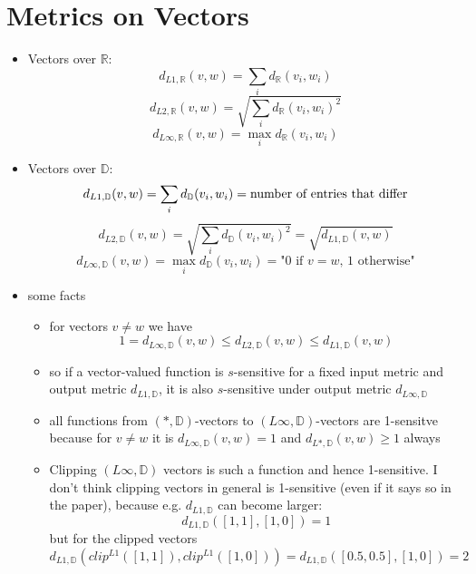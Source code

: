 \documentclass{article}
\begin{document}
\section*{Metrics on Vectors}
\begin{itemize}
   \item Vectors over $\mathbb{R}$:
      \[  d_{L1,\mathbb{R}}(v,w) = \sum_i d_\mathbb{R}(v_i, w_i) \]
      \[  d_{L2,\mathbb{R}}(v,w) = \sqrt{\sum_i d_\mathbb{R}(v_i, w_i)^2} \]
      \[  d_{L\infty,\mathbb{R}}(v,w) = \max_i d_\mathbb{R}(v_i, w_i) \]
   \item Vectors over $\mathbb{D}$:
      \[  d_{L1,\mathbb{D}}(v,w) = \sum_i d_\mathbb{D}(v_i, w_i) = \textnormal{number of entries that differ} \]
      \[  d_{L2,\mathbb{D}}(v,w) = \sqrt{\sum_i d_\mathbb{D}(v_i, w_i)^2} = \sqrt{d_{L1,\mathbb{D}}(v,w) } \]
      \[  d_{L\infty,\mathbb{D}}(v,w) = \max_i d_\mathbb{D}(v_i, w_i) = \text{"} 0 \text{ if } v=w \text{, 1 otherwise"} \]
   \item some facts
      \begin{itemize}
         \item for vectors $v\neq w$ we have
            $$1 = d_{{L\infty},\mathbb{D}}(v,w) \leq d_{L2,\mathbb{D}}(v,w) \leq d_{L1,\mathbb{D}}(v,w)$$
         \item so if a vector-valued function is $s$-sensitive for a fixed input metric and output metric $d_{L1,\mathbb{D}}$, it is also $s$-sensitive under output metric $d_{L\infty,\mathbb{D}}$
         \item all functions from $(*,\mathbb{D})$-vectors to $(L\infty,\mathbb{D})$-vectors are 1-sensitve because
         for $v \neq w$ it is $d_{L\infty, \mathbb{D}}(v,w) = 1$ and  $d_{L*, \mathbb{D}}(v,w) \geq 1$ always
         \item Clipping $(L\infty,\mathbb{D})$ vectors is such a function and hence 1-sensitive. I don't think clipping vectors in general is 1-sensitive (even if it says so in the paper), because e.g. $d_{L1,\mathbb{D}}$ can become larger:
            $$d_{L1,\mathbb{D}}([1,1],[1,0]) = 1$$
            but for the clipped vectors 
            $$d_{L1,\mathbb{D}}(clip^{L1}([1,1]), clip^{L1}([1,0])) = d_{L1,\mathbb{D}}([0.5,0.5],[1,0]) = 2$$
      \end{itemize}
\end{itemize}
\end{document}

